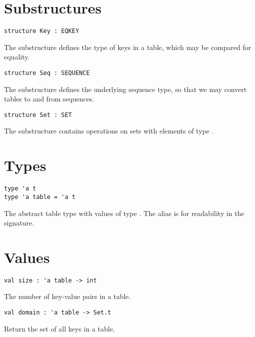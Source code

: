 \section{Substructures}

\begin{gram}
\begin{verbatim}
structure Key : EQKEY
\end{verbatim}
The  substructure defines the type of keys in a table, which may be
compared for equality.
\end{gram}

\begin{gram}
\begin{verbatim}
structure Seq : SEQUENCE
\end{verbatim}
The  substructure defines the underlying sequence type, so that we
may convert tables to and from sequences.
\end{gram}

\begin{gram}
\begin{verbatim}
structure Set : SET
\end{verbatim}
The  substructure contains operations on sets with elements of type
.
\end{gram}


\section{Types}

\begin{gram}
\begin{verbatim}
type 'a t
type 'a table = 'a t
\end{verbatim}
The abstract table type with values of type . The alias  is
for readability in the signature.
\end{gram}

\section{Values}

\begin{gram}[size]
\begin{verbatim}
val size : 'a table -> int
\end{verbatim}
The number of key-value pairs in a table.
\end{gram}

\begin{gram}[domain]
\begin{verbatim}
val domain : 'a table -> Set.t
\end{verbatim}
Return the set of all keys in a table.
\end{gram}

